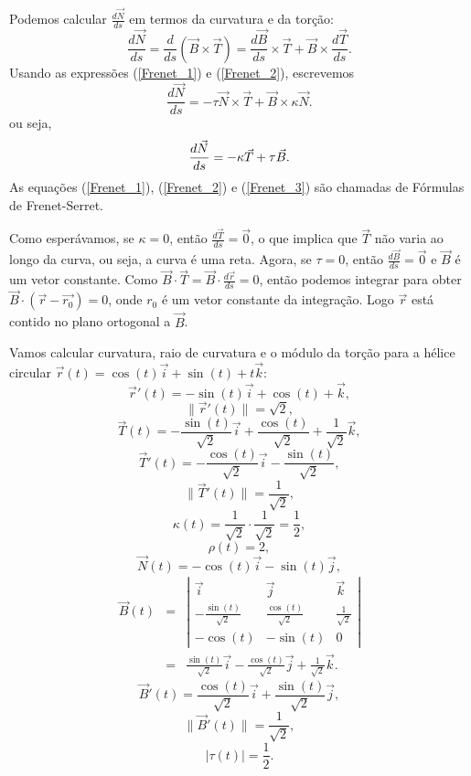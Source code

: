 Podemos calcular $\frac{d\vec{N}}{ds}$ em termos da curvatura e da torção:
\begin{equation*}
\frac{d\vec{N}}{ds}=\frac{d}{ds}\left(\vec{B}\times\vec{T}\right)=\frac{d\vec{B}}{ds}\times \vec{T}+\vec{B}\times\frac{d\vec{T}}{ds}.
\end{equation*}
Usando as expressões (\ref{Frenet_1}) e (\ref{Frenet_2}), escrevemos
\begin{equation*}
\frac{d\vec{N}}{ds}=-\tau\vec{N} \times \vec{T}+\vec{B}\times \kappa \vec{N}.
\end{equation*}
ou seja,
\begin{equation}{\label{Frenet_3}}
\frac{d\vec{N}}{ds}=-\kappa \vec{T}+\tau \vec{B}.
\end{equation}
As equações (\ref{Frenet_1}), (\ref{Frenet_2}) e (\ref{Frenet_3}) são chamadas de Fórmulas de Frenet-Serret.

Como esperávamos, se $\kappa=0$, então $\frac{d\vec{T}}{ds}=\vec{0}$, o que implica que $\vec{T}$ não varia ao longo da curva, ou seja, a curva é uma reta. Agora, se $\tau=0$, então $\frac{d\vec{B}}{ds}=\vec{0}$ e $\vec{B}$ é um vetor constante. Como $\vec{B}\cdot \vec{T}=\vec{B}\cdot \frac{d\vec{r}}{ds}=0$, então podemos integrar para obter $\vec{B}\cdot (\vec{r}-\vec{r_0})=0$, onde $r_0$ é um vetor constante da integração. Logo $\vec{r}$ está contido no plano ortogonal a $\vec{B}$.



\begin{ex} Vamos calcular curvatura, raio de curvatura e o módulo da torção para a hélice circular $\vec{r}(t)=\cos(t)\vec{i}+\sin(t)+t\vec{k}$:
$$
\vec{r}'(t)=-\sin(t)\vec{i}+\cos(t)+\vec{k},
$$
$$
\|\vec{r}'(t)\|=\sqrt{2},
$$
$$
\vec{T}(t)=-\frac{\sin(t)}{\sqrt{2}}\vec{i}+\frac{\cos(t)}{\sqrt{2}}+\frac{1}{\sqrt{2}}\vec{k},
$$
$$
\vec{T}'(t)=-\frac{\cos(t)}{\sqrt{2}}\vec{i}-\frac{\sin(t)}{\sqrt{2}},
$$
$$
\|\vec{T}'(t)\|=\frac{1}{\sqrt{2}},
$$
$$
\kappa(t)=\frac{1}{\sqrt{2}}\cdot \frac{1}{\sqrt{2}}=\frac{1}{2},
$$
$$
\rho(t)=2,
$$
$$
\vec{N}(t)=-\cos(t)\vec{i}-\sin(t)\vec{j},
$$
\begin{eqnarray*}
\vec{B}(t)&=&\left|\begin{array}{ccc}\vec{i}&\vec{j}&\vec{k}\\-\frac{\sin(t)}{\sqrt{2}}&\frac{\cos(t)}{\sqrt{2}}&\frac{1}{\sqrt{2}}\\-\cos(t)&-\sin(t)&0\end{array}\right|\\
&=&\frac{\sin(t)}{\sqrt{2}}\vec{i}-\frac{\cos(t)}{\sqrt{2}}\vec{j}+\frac{1}{\sqrt{2}}\vec{k}.
\end{eqnarray*}
$$
\vec{B}'(t)=\frac{\cos(t)}{\sqrt{2}}\vec{i}+\frac{\sin(t)}{\sqrt{2}}\vec{j},
$$
$$
\|\vec{B}'(t)\|=\frac{1}{\sqrt{2}},
$$
$$
|\tau(t)|=\frac{1}{2}.
$$
\end{ex}


